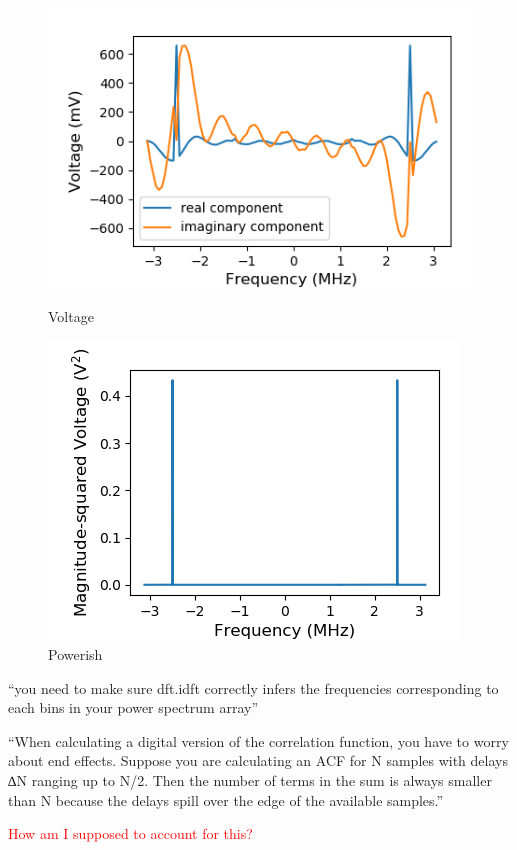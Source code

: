 \documentclass[a4paper]{article}
\begin{document}
\begin{figure}
\centering
\begin{minipage}{.5\textwidth}
	\centering
	\includegraphics[width=.8\linewidth]{5-3/volt3}
	\caption{Voltage}
	\label{fig:Volt3}
\end{minipage}%
\begin{minipage}{.5\textwidth}
	\centering
	\includegraphics[width=.8\linewidth]{5-3/pow3}
	\caption{Powerish}
	\label{fig:SyPw3}
\end{minipage}
\end{figure}

``you need to make sure dft.idft correctly infers the frequencies corresponding to each bins in your power spectrum array''

``When calculating a digital version of the correlation function, you have to worry about end effects.
Suppose you are calculating an ACF for N samples with delays ∆N ranging up to N/2. Then the
number of terms in the sum is always smaller than N because the delays spill over the edge of the
available samples.''

\textcolor{red}{How am I supposed to account for this?}
\end{document}
